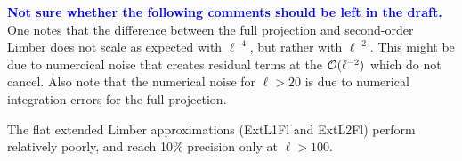 \documentclass[fleqn,usenatbib]{mnras} %
\newcommand{\mk}[1]{{\bf\textcolor{blue}{#1}}}
\begin{document}
\mk{Not sure whether the following comments should be left in the draft.} One
notes that the difference between the full projection and second-order Limber
does not scale as expected with $\ell^{-4}$, but rather with $\ell^{-2}$. This
might be due to numercical noise that creates residual terms at the ${\cal
O}(\ell^{-2})$ which do not cancel. Also note that the numerical noise for
$\ell > 20$ is due to numerical integration errors for the full projection.

The flat extended Limber approximations (ExtL1Fl and ExtL2Fl) perform relatively poorly, and
reach 10\% precision only at $\ell > 100$.

\begin{figure}

  \begin{center}
  \end{center}


\end{figure}
\end{document}
